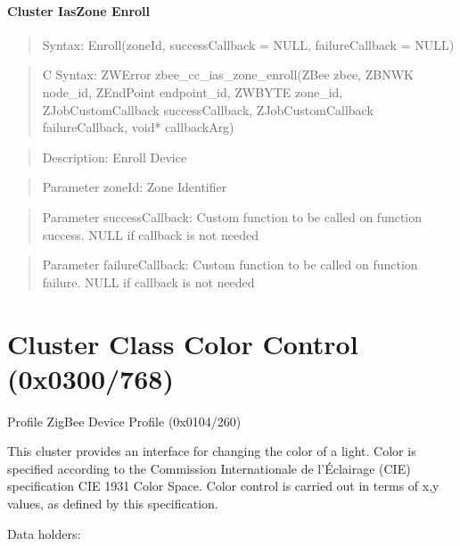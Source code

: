 \paragraph{Cluster IasZone Enroll}
\begin{quote}Syntax: Enroll(zoneId, successCallback = NULL, failureCallback = NULL)\end{quote}
\begin{quote}C Syntax: ZWError zbee\_cc\_ias\_zone\_enroll(ZBee zbee, ZBNWK node\_id, ZEndPoint endpoint\_id, ZWBYTE zone\_id, ZJobCustomCallback successCallback, ZJobCustomCallback failureCallback, void* callbackArg)\end{quote}
\begin{quote}Description: Enroll Device\end{quote}
\begin{quote}Parameter zoneId: Zone Identifier\end{quote}
\begin{quote}Parameter successCallback: Custom function to be called on function success. NULL if callback is not needed\end{quote}
\begin{quote}Parameter failureCallback: Custom function to be called on function failure. NULL if callback is not needed\end{quote}



\section{Cluster Class Color Control (0x0300/768)}

Profile ZigBee Device Profile (0x0104/260)

This cluster provides an interface for changing the color of a light. Color is specified according to the Commission Internationale de l'Éclairage (CIE) specification CIE 1931 Color Space. Color control is carried out in terms of x,y values, as defined by this specification.
\newline

\noindent
Data holders:

